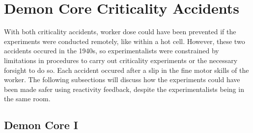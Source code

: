 \documentclass[11pt,a4paper]{article}
\begin{document}



\newpage


\section{Demon Core Criticality Accidents}

With both criticality accidents, worker dose could have been prevented if the experiments were conducted remotely, like within a hot cell. However, these two accidents occured in the 1940s, so experimentalists were constrained by limitations in procedures to carry out criticality experiments or the necessary forsight to do so. Each accident occured after a slip in the fine motor skills of the worker. The following subsections will discuss how the experiments could have been made safer using reactivity feedback, despite the experimentalists being in the same room.

\subsection{Demon Core I}
\end{document}
